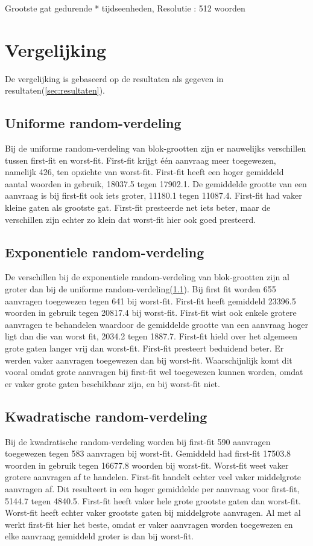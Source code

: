 \documentclass[a4paper]{article}
\begin{document}
Grootste gat gedurende * tijdseenheden, Resolutie : 512 woorden
\newpage

	\section{Vergelijking}\label{sec:vergelijking}
	De vergelijking is gebaseerd op de resultaten als gegeven in resultaten(\ref{sec:resultaten}).

	\subsection{Uniforme random-verdeling}\label{sec:urv}
	Bij de uniforme random-verdeling van blok-grootten zijn er nauwelijks verschillen tussen first-fit en worst-fit. First-fit krijgt \'e\'en aanvraag meer toegewezen, namelijk 426, ten opzichte van worst-fit. First-fit heeft een hoger gemiddeld aantal woorden in gebruik, 18037.5 tegen 17902.1. De gemiddelde grootte van een aanvraag is bij first-fit ook iets groter, 11180.1 tegen 11087.4. First-fit had vaker kleine gaten als grootste gat. First-fit presteerde net iets beter, maar de verschillen zijn echter zo klein dat worst-fit hier ook goed presteerd.

	\subsection{Exponentiele random-verdeling}\label{sec:erv}
	De verschillen bij de exponentiele random-verdeling van blok-grootten zijn al groter dan bij de uniforme random-verdeling(\ref{sec:urv}). Bij first fit worden 655 aanvragen toegewezen tegen 641 bij worst-fit. First-fit heeft gemiddeld 23396.5 woorden in gebruik tegen 20817.4 bij worst-fit. First-fit wist ook enkele grotere aanvragen te behandelen waardoor de gemiddelde grootte van een aanvraag hoger ligt dan die van worst fit, 2034.2 tegen 1887.7. First-fit hield over het algemeen grote gaten langer vrij dan worst-fit. First-fit presteert beduidend beter. Er werden vaker aanvragen toegewezen dan bij worst-fit. Waarschijnlijk komt dit vooral omdat grote aanvragen bij first-fit wel toegewezen kunnen worden, omdat er vaker grote gaten beschikbaar zijn, en bij worst-fit niet.

	\subsection{Kwadratische random-verdeling}\label{sec:krv}
	Bij de kwadratische random-verdeling worden bij first-fit 590 aanvragen toegewezen tegen 583 aanvragen bij worst-fit. Gemiddeld had first-fit 17503.8 woorden in gebruik tegen 16677.8 woorden bij worst-fit. Worst-fit weet vaker grotere aanvragen af te handelen. First-fit handelt echter veel vaker middelgrote aanvragen af. Dit resulteert in een hoger gemiddelde per aanvraag voor first-fit, 5144.7 tegen 4840.5. First-fit heeft vaker hele grote grootste gaten dan worst-fit. Worst-fit heeft echter vaker grootste gaten bij middelgrote aanvragen. Al met al werkt first-fit hier het beste, omdat er vaker aanvragen worden toegewezen en elke aanvraag gemiddeld groter is dan bij worst-fit.
\end{document}
